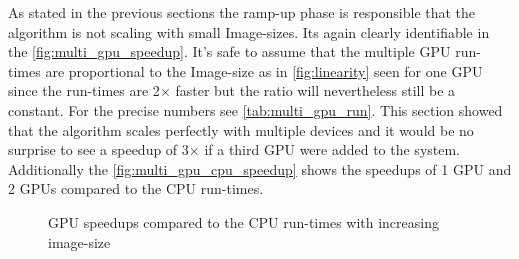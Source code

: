 As stated in the previous sections the ramp-up phase is responsible that the
algorithm is not scaling with small Image-sizes. Its again clearly identifiable
in the \autoref{fig:multi_gpu_speedup}. It's safe to assume that the multiple
\gls{GPU} run-times are proportional to the Image-size as in
\autoref{fig:linearity} seen for one \gls{GPU} since the run-times are 2$\times$
faster but the ratio will nevertheless still be a constant. For the precise
numbers see \autoref{tab:multi_gpu_run}. This section showed that the algorithm
scales perfectly with multiple devices and it would be no surprise to see a
speedup of 3$\times$ if a third \gls{GPU} were added to the system. Additionally
the \autoref{fig:multi_gpu_cpu_speedup} shows the speedups of 1 \gls{GPU} and 2
\glspl{GPU} compared to the \gls{CPU} run-times.

\begin{figure}[ht]
  \centering
	

	\tableA
	\tableB	

	\caption{{\protect\Gls{GPU}} speedups compared to the {\protect\gls{CPU}} 
					 run-times with increasing image-size}%
	\label{fig:multi_gpu_cpu_speedup}
\end{figure}

